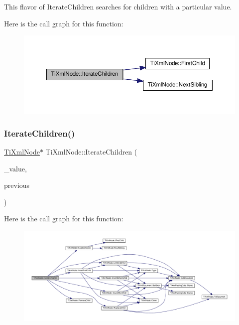 This flavor of Iterate\+Children searches for children with a particular \textquotesingle{}value\textquotesingle{}. 

Here is the call graph for this function\+:
\nopagebreak
\begin{figure}[H]
\begin{center}
\leavevmode
\includegraphics[width=350pt]{class_ti_xml_node_a74bc68a536c279a42af346cb1454f143_cgraph}
\end{center}
\end{figure}
\mbox{\label{class_ti_xml_node_a67ba8275e533e6f76340236c42ea0aea}} 
\subsubsection{\texorpdfstring{Iterate\+Children()}{IterateChildren()}\hspace{0.1cm}{\footnotesize\ttfamily [4/4]}}
{\footnotesize\ttfamily \hyperlink{class_ti_xml_node}{Ti\+Xml\+Node}$\ast$ Ti\+Xml\+Node\+::\+Iterate\+Children (\begin{DoxyParamCaption}\item[{const char $\ast$}]{\+\_\+value,  }\item[{const \hyperlink{class_ti_xml_node}{Ti\+Xml\+Node} $\ast$}]{previous }\end{DoxyParamCaption})\hspace{0.3cm}{\ttfamily [inline]}}

Here is the call graph for this function\+:
\nopagebreak
\begin{figure}[H]
\begin{center}
\leavevmode
\includegraphics[width=350pt]{class_ti_xml_node_a67ba8275e533e6f76340236c42ea0aea_cgraph}
\end{center}
\end{figure}
\mbox{\label{class_ti_xml_node_af3a04120b1ed2fead2f4bb72cbea845e}} 
